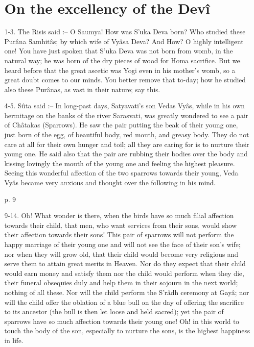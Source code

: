 \chapter{On the excellency of the Devî}

 

1-3. The Risis said :-- O Saumya! How was S’uka Deva born? Who studied these Purâna Samhitâs; by which wife of Vyâsa Deva? And How? O highly intelligent one! You have just spoken that S’uka Deva was not born from womb, in the natural way; he was born of the dry pieces of wood for Homa sacrifice. But we heard before that the great ascetic was Yogi even in his mother's womb, so a great doubt comes to our minds. You better remove that to-day; how he studied also these Purânas, as vast in their nature; say this.

 

4-5. Sûta said :-- In long-past days, Satyavati's son Vedas Vyâs, while in his own hermitage on the banks of the river Sarasvati, was greatly wondered to see a pair of Châtakas (Sparrows). He saw the pair putting  the beak of their young one, just born of the egg, of beautiful body, red mouth, and greasy body. They do not care at all for their own hunger and toil; all they are caring for is to nurture their young one. He said also that the pair are rubbing their bodies over the body and kissing lovingly the mouth of the young one and feeling the highest pleasure. Seeing this wonderful affection of the two sparrows towards their young, Veda Vyâs became very anxious and thought over the following in his mind.

 

p. 9

 

9-14. Oh! What wonder is there, when the birds have so much filial affection towards their child, that men, who want services from their sons, would show their affection towards their sons! This pair of sparrows will not perform the happy marriage of their young one and will not see the face of their son’s wife; nor when they will grow old, that their child would become very religious and serve them to attain great merits in Heaven. Nor do they expect that their child would earn money and satisfy them nor the child would perform when they die, their funeral obsequies duly and help them in their sojourn in the next world; nothing of all these. Nor will the child perform the S’râdh ceremony at Gayâ; nor will the child offer the oblation of a blue bull on the day of offering the sacrifice to its ancestor (the bull is then let loose and held sacred); yet the pair of sparrows have so much affection towards their young one! Oh! in this world to touch the body of the son, especially to nurture the sons, is the highest happiness in life.

